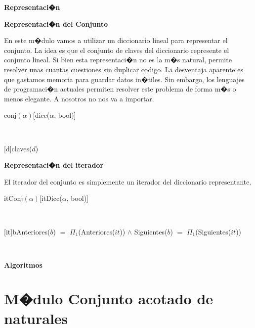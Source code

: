 \documentclass[a4paper,10pt]{article}
\newenvironment{Representacion}{%
  \vspace*{2ex}%
  \noindent\textbf{\Large Representaci�n}%
  \vspace*{2ex}%
}{}
\newenvironment{Algoritmos}{%
  \vspace*{2ex}%
  \noindent\textbf{\Large Algoritmos}%
  \vspace*{2ex}%
}{}
\newcommand{\Titulo}[1]{
  \vspace*{1ex}\par\noindent\textbf{\large #1}\par
}
\begin{document}
\begin{Representacion}
  
  \Titulo{Representaci�n del Conjunto}

  En este m�dulo vamos a utilizar un diccionario lineal para representar el conjunto.  La idea es que el conjunto de claves del diccionario represente el conjunto lineal.  Si bien esta representaci�n no es la m�s natural, permite resolver unas cuantas cuestiones sin duplicar codigo.  La desventaja aparente es que gastamos memoria para guardar datos in�tiles.  Sin embargo, los lenguajes de programaci�n actuales permiten resolver este problema de forma m�s o menos elegante.  A nosotros no nos va a importar.

  \begin{Estructura}{conj$(\alpha)$}[dicc($\alpha$, bool)]
  \end{Estructura}


  ~

  [d]{claves($d$)}

  \Titulo{Representaci�n del iterador}

  El iterador del conjunto es simplemente un iterador del diccionario representante.

  \begin{Estructura}{itConj$(\alpha)$}[itDicc($\alpha$, bool)]
  \end{Estructura}


  ~

  [it]{b}{Anteriores($b$) $=$ $\Pi_1$(Anteriores($it$)) $\land$ Siguientes($b$) $=$ $\Pi_1$(Siguientes($it$))}\mbox{}

  ~


\end{Representacion}

\begin{Algoritmos}
  
\end{Algoritmos}



\section{M�dulo Conjunto acotado de naturales}
\end{document}
